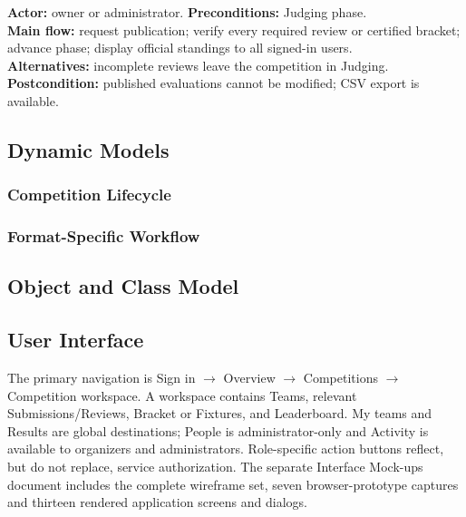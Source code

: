 \documentclass[12pt]{article}
\begin{document}
\begin{contentbox}
\textbf{Actor:} owner or administrator. \textbf{Preconditions:} Judging phase.\\
\textbf{Main flow:} request publication; verify every required review or certified bracket; advance phase; display official standings to all signed-in users.\\
\textbf{Alternatives:} incomplete reviews leave the competition in Judging.\\
\textbf{Postcondition:} published evaluations cannot be modified; CSV export is available.
\end{contentbox}
\begin{umlpage}
\subsection{Dynamic Models}
\clearpage\subsubsection*{Competition Lifecycle}
\clearpage\subsubsection*{Format-Specific Workflow}
\end{umlpage}
\begin{umlpage}
\subsection{Object and Class Model}
\end{umlpage}
\clearpage\subsection{User Interface}
The primary navigation is Sign in $\rightarrow$ Overview $\rightarrow$ Competitions $\rightarrow$ Competition workspace. A workspace contains Teams, relevant Submissions/Reviews, Bracket or Fixtures, and Leaderboard. My teams and Results are global destinations; People is administrator-only and Activity is available to organizers and administrators. Role-specific action buttons reflect, but do not replace, service authorization.
The separate Interface Mock-ups document includes the complete wireframe set, seven browser-prototype captures and thirteen rendered application screens and dialogs.
\end{document}
